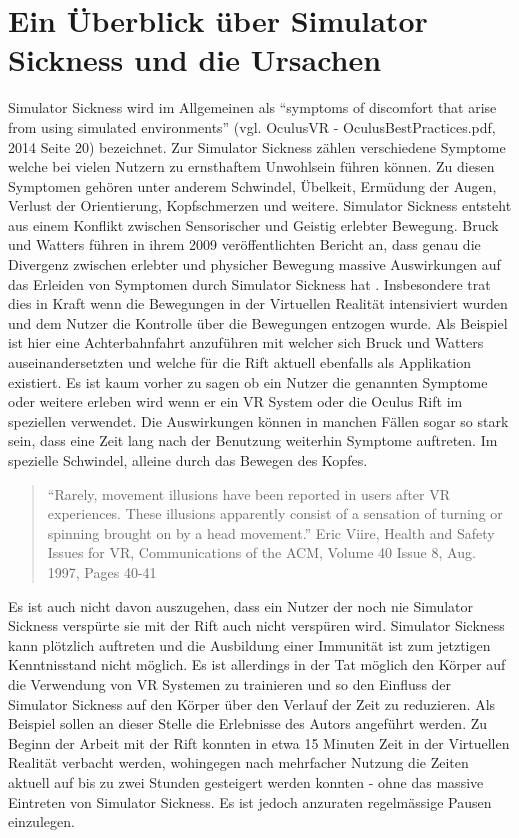 \documentclass[pagesize, paper=a4, fontsize=12pt,titlepage=true, headings=small, headnosepline, abstractoff, liststotoc, nochapterprefix, plainheadsepline]{scrreprt}
\begin{document}
\section{Ein Überblick über Simulator Sickness und die Ursachen}
Simulator Sickness wird im Allgemeinen als "`symptoms of discomfort that arise from using simulated environments"' (vgl. OculusVR - OculusBestPractices.pdf, 2014 Seite 20) bezeichnet.
Zur Simulator Sickness zählen verschiedene Symptome welche bei vielen Nutzern zu ernsthaftem Unwohlsein führen können. Zu diesen Symptomen gehören unter anderem Schwindel, Übelkeit, Ermüdung der Augen, Verlust der Orientierung, Kopfschmerzen und weitere. Simulator Sickness entsteht aus einem Konflikt zwischen Sensorischer und Geistig erlebter Bewegung. Bruck und Watters führen in ihrem 2009 veröffentlichten Bericht an, dass genau die Divergenz zwischen erlebter und physicher Bewegung massive Auswirkungen auf das Erleiden von Symptomen durch Simulator Sickness hat \cite{BruckWatters2009}. Insbesondere trat dies in Kraft wenn die Bewegungen in der Virtuellen Realität intensiviert wurden und dem Nutzer die Kontrolle über die Bewegungen entzogen wurde. Als Beispiel ist hier eine Achterbahnfahrt anzuführen mit welcher sich Bruck und Watters auseinandersetzten und welche für die Rift aktuell ebenfalls als  Applikation existiert. Es ist kaum vorher zu sagen ob ein Nutzer die genannten Symptome oder weitere erleben wird wenn er ein VR System oder die Oculus Rift im speziellen verwendet. Die Auswirkungen können in manchen Fällen sogar so stark sein, dass eine Zeit lang nach der Benutzung weiterhin Symptome auftreten. Im spezielle Schwindel, alleine durch das Bewegen des Kopfes.
\begin{quote}
"`Rarely, movement illusions have been reported in users after VR experiences. These illusions apparently consist of a sensation of turning or spinning brought on by a head movement."' Eric Viire, Health and Safety Issues for VR, Communications of the ACM, Volume 40 Issue 8, Aug. 1997, Pages 40-41 
\cite{Viire:1997:HSI:257874.257882}
\end{quote}


Es ist auch nicht davon auszugehen, dass ein Nutzer der noch nie Simulator Sickness verspürte sie mit der Rift auch nicht verspüren wird. Simulator Sickness kann plötzlich auftreten und die Ausbildung einer Immunität ist zum jetztigen Kenntnisstand nicht möglich. Es ist allerdings in der Tat möglich den Körper auf die Verwendung von VR Systemen zu trainieren und so den Einfluss der Simulator Sickness auf den Körper über den Verlauf der Zeit zu reduzieren. Als Beispiel sollen an dieser Stelle die Erlebnisse des Autors angeführt werden. Zu Beginn der Arbeit mit der Rift konnten in etwa 15 Minuten Zeit in der Virtuellen Realität verbacht werden, wohingegen nach mehrfacher Nutzung die Zeiten aktuell auf bis zu zwei Stunden gesteigert werden konnten - ohne das massive  Eintreten von Simulator Sickness. Es ist jedoch anzuraten regelmässige Pausen einzulegen.
\end{document}
